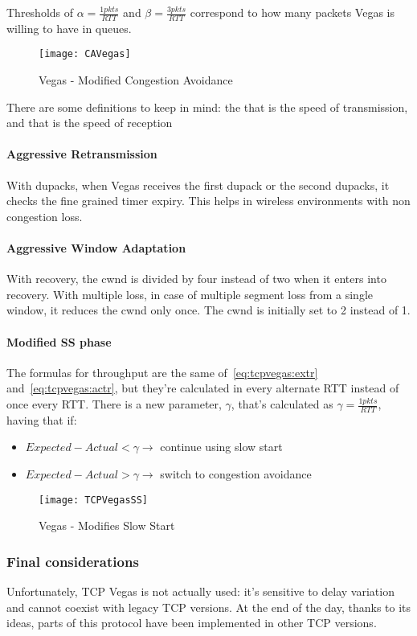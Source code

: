 Thresholds of $\alpha = \frac{1 pkts}{RTT}$ and
$\beta = \frac{3 pkts}{RTT}$ correspond to how many packets Vegas is willing
to have in queues.
\begin{figure}[t]
  \centering
  \texttt{[image: CAVegas]}
  \caption{Vegas - Modified Congestion Avoidance}
  \label{fig:tcpVegas:mca}
\end{figure}

There are some definitions to keep in mind: the  that is
the speed of transmission, and  that is the speed of reception

\paragraph*{Aggressive Retransmission} With dupacks, when Vegas receives the
first dupack or the second dupacks, it checks the fine grained timer expiry.
This helps in wireless environments with non congestion loss.

\paragraph*{Aggressive Window Adaptation} With recovery, the cwnd is divided by
four instead of two when it enters into recovery. With multiple loss, in case of
multiple segment loss from a single window, it reduces the cwnd only once. The
cwnd is initially set to 2 instead of 1.

\paragraph*{Modified SS phase} The formulas for throughput are the same
of~\ref{eq:tcpvegas:extr} and~\ref{eq:tcpvegas:actr}, but they're calculated in
every alternate RTT instead of once every RTT. There is a new parameter, $\gamma$,
that's calculated as $\gamma = \frac{1pkts}{RTT}$, having that if:
\begin{itemize}
\item $Expected - Actual < \gamma \to$ continue using slow start
\item $Expected - Actual > \gamma \to$ switch to congestion avoidance
\end{itemize}

\begin{figure}[h]
  \centering
  \texttt{[image: TCPVegasSS]}
  \caption{Vegas - Modifies Slow Start}
  \label{fig:tcpvegas:ss}
\end{figure}

\subsubsection{Final considerations}

Unfortunately, TCP Vegas is not actually used: it's sensitive to delay variation
and cannot coexist with legacy TCP versions. At the end of the day, thanks to
its ideas, parts of this protocol have been implemented in other TCP versions.
